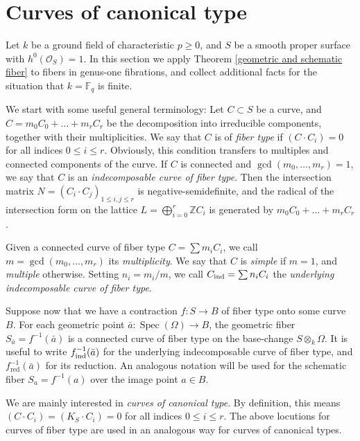 \documentclass[oneside, 12pt]{amsart}
\newcommand\mylabel[1]{\label{#1}\marginpar{\vspace{-1ex}\medskip\medskip\footnotesize \tt #1}}
\renewcommand\mylabel[1]{\label{#1}}
\theoremstyle{definition}
\theoremstyle{remark}
\newcommand{\ZZ}{\mathbb{Z}}
\newcommand{\FF}{\mathbb{F}}
\renewcommand{\O}{\mathscr{O}}
\newcommand{\ra}{\rightarrow}
\newcommand{\red}{{\operatorname{red}}}
\newcommand{\Spec}{\operatorname{Spec}}
\newcommand{\ind}{\text{\rm ind}}
\newcommand{\ba}{{\bar{a}}}
\newcommand{\inv}{{-1}}
\begin{document}
 
\section{Curves of canonical  type}
\mylabel{Curves}

Let $k$ be a ground field of characteristic $p\geq 0$, and $S$ be a smooth proper surface with $h^0(\O_S)=1$.
In this section we apply Theorem \ref{geometric and schematic fiber} to fibers in genus-one fibrations,
and collect additional facts for the situation that $k=\FF_q$ is finite.

We start with  some useful general terminology:
Let $C\subset S$ be a curve, and  $C=m_0C_0+\ldots+m_rC_r$ be the decomposition into irreducible components, together with
their multiplicities.
We say that $C$ is of \emph{fiber type} if  
$(C\cdot C_i)= 0$ for all indices  $0\leq i\leq r$.
Obviously, this condition transfers to multiples and connected components of the curve.
If $C$ is connected and $\gcd(m_0,\ldots,m_r)=1$, we say that
$C$ is an \emph{indecomposable curve of fiber type}. 
Then the intersection matrix $N=(C_i\cdot C_j)_{1\leq i,j\leq r}$ is negative-semidefinite,
and   the radical of
the intersection form on the lattice $L=\bigoplus_{i=0}^r \ZZ C_i$ is generated by $m_0C_0+\ldots+m_rC_r$.

Given a connected curve  of fiber type $C=\sum m_iC_i$, we call $m=\gcd(m_0,\ldots,m_r)$ its \emph{multiplicity}.
We say that $C$ is \emph{simple} if $m=1$, and \emph{multiple} otherwise.
Setting $n_i=m_i/m$, we call  $C_\ind=\sum n_iC_i$ the \emph{underlying indecomposable curve of fiber type}.

Suppose now that we have a contraction $f:S\ra B$ of fiber type onto some curve $B$.
For each geometric point $\ba:\Spec(\Omega)\ra B$, the geometric fiber $S_\ba=f^{-1}(\ba)$ is a connected 
curve of fiber type on the base-change $S\otimes_k\Omega$. It is useful to write $f^\inv_\ind(\ba)$ for the underlying
indecomposable curve of fiber type, and $f^\inv_\red(\ba)$ for its reduction.
An analogous notation will be used for  the schematic fiber $S_a=f^\inv(a)$
over the image point $a\in B$.
 
We are mainly interested in \emph{curves of canonical type}. By definition, this means 
$(C\cdot C_i)=(K_S\cdot C_i)=0$ for all indices $0\leq i\leq r$. The above locutions for curves of fiber type
are used in an analogous way for  curves of canonical types.
\end{document}
